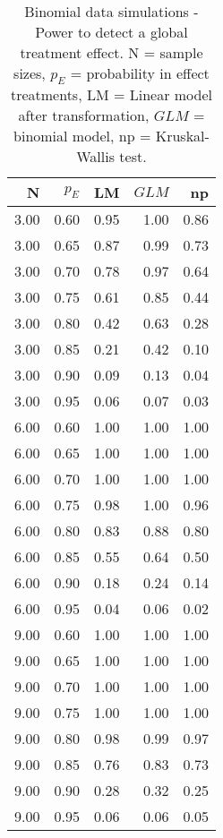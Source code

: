 \begin{table}[H]
\centering
\caption{Binomial data simulations - Power to detect a global treatment effect. N = sample sizes, 
             $p_E$ = probability in effect treatments, LM = Linear model after transformation, 
             $GLM$ = binomial model, np = Kruskal-Wallis test.} 
\label{tab:pow_glob_p}
{\footnotesize
\begin{tabular}{rrrrr}
  \hline
N & $p_E$ & LM & $GLM$ & np \\ 
  \hline
3.00 & 0.60 & 0.95 & 1.00 & 0.86 \\ 
  3.00 & 0.65 & 0.87 & 0.99 & 0.73 \\ 
  3.00 & 0.70 & 0.78 & 0.97 & 0.64 \\ 
  3.00 & 0.75 & 0.61 & 0.85 & 0.44 \\ 
  3.00 & 0.80 & 0.42 & 0.63 & 0.28 \\ 
  3.00 & 0.85 & 0.21 & 0.42 & 0.10 \\ 
  3.00 & 0.90 & 0.09 & 0.13 & 0.04 \\ 
  3.00 & 0.95 & 0.06 & 0.07 & 0.03 \\ 
  6.00 & 0.60 & 1.00 & 1.00 & 1.00 \\ 
  6.00 & 0.65 & 1.00 & 1.00 & 1.00 \\ 
  6.00 & 0.70 & 1.00 & 1.00 & 1.00 \\ 
  6.00 & 0.75 & 0.98 & 1.00 & 0.96 \\ 
  6.00 & 0.80 & 0.83 & 0.88 & 0.80 \\ 
  6.00 & 0.85 & 0.55 & 0.64 & 0.50 \\ 
  6.00 & 0.90 & 0.18 & 0.24 & 0.14 \\ 
  6.00 & 0.95 & 0.04 & 0.06 & 0.02 \\ 
  9.00 & 0.60 & 1.00 & 1.00 & 1.00 \\ 
  9.00 & 0.65 & 1.00 & 1.00 & 1.00 \\ 
  9.00 & 0.70 & 1.00 & 1.00 & 1.00 \\ 
  9.00 & 0.75 & 1.00 & 1.00 & 1.00 \\ 
  9.00 & 0.80 & 0.98 & 0.99 & 0.97 \\ 
  9.00 & 0.85 & 0.76 & 0.83 & 0.73 \\ 
  9.00 & 0.90 & 0.28 & 0.32 & 0.25 \\ 
  9.00 & 0.95 & 0.06 & 0.06 & 0.05 \\ 
   \hline
\end{tabular}
}
\end{table}
